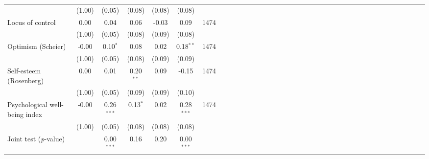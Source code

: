{\begin{tabular}{l*{6}{SSSSSc}}
          &   (1.00)&   (0.05)&   (0.08)&   (0.08)&   (0.08)&         \\
Locus of control&     0.00&     0.04&     0.06&    -0.03&     0.09&     1474\\
          &   (1.00)&   (0.05)&   (0.08)&   (0.09)&   (0.08)&         \\
Optimism (Scheier)&    -0.00&0.10$^{*}$&     0.08&     0.02&0.18$^{**}$&     1474\\
          &   (1.00)&   (0.05)&   (0.08)&   (0.09)&   (0.09)&         \\
Self-esteem (Rosenberg)&     0.00&     0.01&0.20$^{**}$&     0.09&    -0.15&     1474\\
          &   (1.00)&   (0.05)&   (0.09)&   (0.09)&   (0.10)&         \\
Psychological well-being index&    -0.00&0.26$^{***}$&0.13$^{*}$&     0.02&0.28$^{***}$&     1474\\
          &   (1.00)&   (0.05)&   (0.08)&   (0.08)&   (0.08)&         \\
\midrule Joint test (\emph{p}-value)&         &0.00$^{***}$&     0.16&     0.20&0.00$^{***}$&         \\
\bottomrule
\end{tabular}
}
